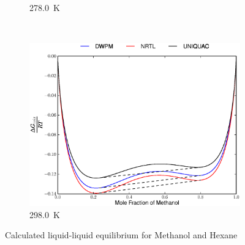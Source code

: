 \begin{figure}[hp]
\begin{subfigure}[h]{0.5\textwidth}
\caption{278.0~$\mathrm{K}$} 
\end{subfigure}%
\\%
\begin{subfigure}[h]{0.5\textwidth}
\centering
\includegraphics[width = \textwidth]{Results_Parts/BinaryParams/methanol-hexane/AllModelsGibbsPlots/T_298.0.eps}
\caption{298.0~$\mathrm{K}$} \label{methanol-hexane298}
\end{subfigure}%
\caption{Calculated liquid-liquid equilibrium for Methanol and Hexane}
\end{figure}
\vspace*{\fill}
\clearpage